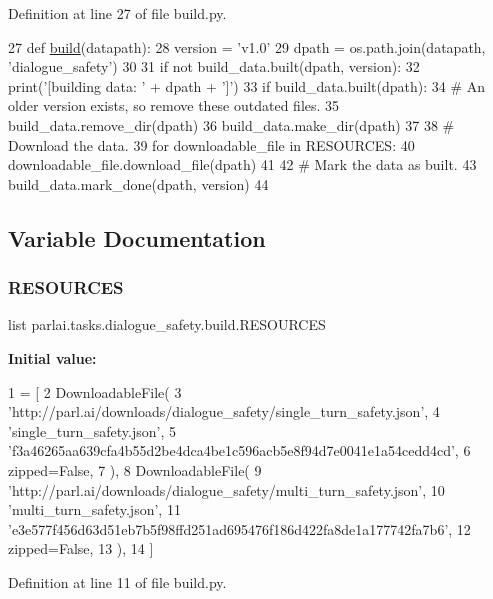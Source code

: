 Definition at line 27 of file build.\+py.


\begin{DoxyCode}
27 \textcolor{keyword}{def }\hyperlink{namespacedialog__babi__feedback_1_1build_a7a9d289f7493a5ded13c4b7f071b6184}{build}(datapath):
28     version = \textcolor{stringliteral}{'v1.0'}
29     dpath = os.path.join(datapath, \textcolor{stringliteral}{'dialogue\_safety'})
30 
31     \textcolor{keywordflow}{if} \textcolor{keywordflow}{not} build\_data.built(dpath, version):
32         print(\textcolor{stringliteral}{'[building data: '} + dpath + \textcolor{stringliteral}{']'})
33         \textcolor{keywordflow}{if} build\_data.built(dpath):
34             \textcolor{comment}{# An older version exists, so remove these outdated files.}
35             build\_data.remove\_dir(dpath)
36         build\_data.make\_dir(dpath)
37 
38         \textcolor{comment}{# Download the data.}
39         \textcolor{keywordflow}{for} downloadable\_file \textcolor{keywordflow}{in} RESOURCES:
40             downloadable\_file.download\_file(dpath)
41 
42         \textcolor{comment}{# Mark the data as built.}
43         build\_data.mark\_done(dpath, version)
44 \end{DoxyCode}


\subsection{Variable Documentation}
\mbox{\label{namespaceparlai_1_1tasks_1_1dialogue__safety_1_1build_aff46ce1360a346f2f6fcb9d9a8cec433}} 
\subsubsection{\texorpdfstring{R\+E\+S\+O\+U\+R\+C\+ES}{RESOURCES}}
{\footnotesize\ttfamily list parlai.\+tasks.\+dialogue\+\_\+safety.\+build.\+R\+E\+S\+O\+U\+R\+C\+ES}

{\bfseries Initial value\+:}
\begin{DoxyCode}
1 =  [
2     DownloadableFile(
3         \textcolor{stringliteral}{'http://parl.ai/downloads/dialogue\_safety/single\_turn\_safety.json'},
4         \textcolor{stringliteral}{'single\_turn\_safety.json'},
5         \textcolor{stringliteral}{'f3a46265aa639cfa4b55d2be4dca4be1c596acb5e8f94d7e0041e1a54cedd4cd'},
6         zipped=\textcolor{keyword}{False},
7     ),
8     DownloadableFile(
9         \textcolor{stringliteral}{'http://parl.ai/downloads/dialogue\_safety/multi\_turn\_safety.json'},
10         \textcolor{stringliteral}{'multi\_turn\_safety.json'},
11         \textcolor{stringliteral}{'e3e577f456d63d51eb7b5f98ffd251ad695476f186d422fa8de1a177742fa7b6'},
12         zipped=\textcolor{keyword}{False},
13     ),
14 ]
\end{DoxyCode}


Definition at line 11 of file build.\+py.

